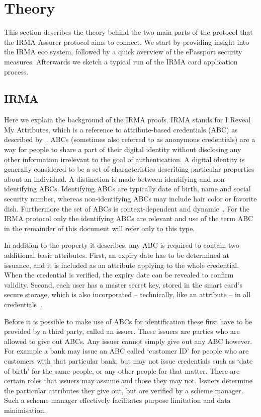\section{Theory}
\label{sec:theory}
This section describes the theory behind the two main parts of the protocol that the IRMA Assurer protocol aims to connect. We start by providing insight into the IRMA eco system, followed by a quick overview of the ePassport security measures. Afterwards we sketch a typical run of the IRMA card application process.

\subsection{IRMA}
Here we explain the background of the IRMA proofs. IRMA stands for I Reveal My Attributes, which is a reference to attribute-based credentials (ABC) as described by~\cite{zeroknowledgeprotocols,abcfortrust,alpar2013credential}. ABCs (sometimes also referred to as anonymous credentials) are a way for people to share a part of their digital identity without disclosing any other information irrelevant to the goal of authentication. A digital identity is generally considered to be a set of characteristics describing particular properties about an individual. A distinction is made between identifying and non-identifying ABCs. Identifying ABCs are typically date of birth, name and social security number, whereas non-identifying ABCs may include hair color or favorite dish. Furthermore the set of ABCs is context-dependent and dynamic~\cite{abcofabc}. For the IRMA protocol only the identifying ABCs are relevant and use of the term ABC in the remainder of this document will refer only to this type.

In addition to the property it describes, any ABC is required to contain two additional basic attributes. First, an expiry date has to be determined at issuance, and it is included as an attribute applying to the whole credential. When the credential is verified, the expiry date can be revealed to confirm validity. Second, each user has a master secret key, stored in the smart card's secure storage, which is also incorporated -- technically, like an attribute -- in all credentials~\cite{alpar2013credential}.

Before it is possible to make use of ABCs for identification these first have to be provided by a third party, called an issuer. These issuers are parties who are allowed to give out ABCs. Any issuer cannot simply give out any ABC however. For example a bank may issue an ABC called `customer ID' for people who are customers with that particular bank, but may not issue credentials such as `date of birth' for the same people, or any other people for that matter. There are certain roles that issuers may assume and those they may not. Issuers determine the particular attributes they give out, but are verified by a scheme manager. Such a scheme manager effectively facilitates purpose limitation and data minimisation.

